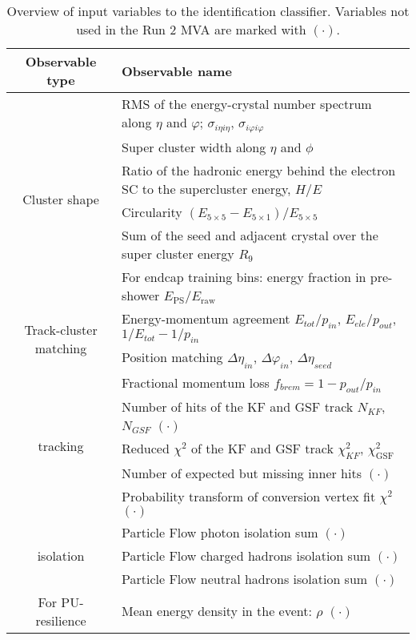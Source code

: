 \begin{table}[ht]
\scriptsize
   \centering
   \begin{tabular}{c l}
   \toprule
Observable type & Observable name \\
   \midrule
\multirow{6}{*}{Cluster shape}
	& RMS of the energy-crystal number spectrum along $\eta$ and $\varphi$; $\sigma_{i\eta i\eta}$, $\sigma_{i\varphi i\varphi}$ \\
	& Super cluster width along $\eta$ and $\phi$ \\
	& Ratio of the hadronic energy behind the electron SC to the supercluster energy, $H/E$ \\
	& Circularity $(E_{5\times5} - E_{5\times1})/E_{5\times5}$ \\
	& Sum of the seed and adjacent crystal over the super cluster energy $R_{9}$ \\
	& For endcap training bins: energy fraction in pre-shower $E_\text{PS}/E_\text{raw}$ \\
\hline
\multirow{2}{*}{Track-cluster matching}
	& Energy-momentum agreement $E_{tot}/p_{in}$, $E_{ele}/p_{out}$, $1/E_{tot} - 1/p_{in}$ \\
	& Position matching $\Delta\eta_{in}$, $\Delta\varphi_{in}$, $\Delta\eta_{seed}$ \\
\hline
\multirow{5}{*}{tracking}
   & Fractional momentum loss $f_{brem} = 1 - p_{out}/p_{in}$ \\
   & Number of hits of the KF and GSF track $N_{KF}$, $N_{GSF}$ $(\mathord{\cdot})$ \\
   & Reduced $\chi^2$ of the KF and GSF track $\chi^{2}_{KF}$, $\chi^{2}_{\textrm{GSF}}$ \\
   & Number of expected but missing inner hits $(\mathord{\cdot})$ \\
   & Probability transform of conversion vertex fit $\chi^2$ $(\mathord{\cdot})$ \\
\hline
\multirow{3}{*}{isolation}
   & Particle Flow photon isolation sum $(\mathord{\cdot})$ \\
   & Particle Flow charged hadrons isolation sum $(\mathord{\cdot})$ \\
   & Particle Flow neutral hadrons isolation sum $(\mathord{\cdot})$ \\
\hline
\multirow{1}{*}{For PU-resilience}
   & Mean energy density in the event: $\rho$ $(\mathord{\cdot})$ \\
   \bottomrule
     \end{tabular}
\small
    \caption{Overview of input variables to the identification classifier. Variables not used in the Run 2 MVA are marked with  $(\mathord{\cdot})$.}
    \label{tab:ele_ID_input_variables}
\end{table}


